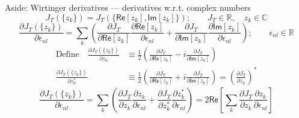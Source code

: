\documentclass[compress, aspectratio=169,usepdftitle=false]{beamer}
\renewcommand{\Re}{\mathsf{Re}}
\renewcommand{\Im}{\mathsf{Im}}
\newcommand{\Reals}{\mathbb{R}}
\newcommand{\Complex}{\mathbb{C}}
\begin{document}
\begin{frame}{Aside: Wirtinger derivatives --- derivatives w.r.t. complex numbers}
    \begin{equation*}
      J_T (\{z_k\}) = J_T(\{\Re[z_k], \Im[z_k]\}); \qquad J_T \in \Reals, \quad z_k \in \Complex
    \end{equation*}
    \pause
    \begin{equation*}
      \frac{\partial J_T (\{z_k\})}{\partial \epsilon_{nl}} =
      \sum_k \left(
        \frac{\partial J_T}{\partial \Re[z_k]}
        \frac{\partial \Re[z_k]}{\partial \epsilon_{nl}}
        + \frac{\partial J_T}{\partial \Im[z_k]}
        \frac{\partial \Im[z_k]}{\partial \epsilon_{nl}}
      \right);
      \qquad \epsilon_{nl} \in \Reals
    \end{equation*}
    \pause
    {
      \color{DarkRed}
      \begin{align*}
        \text{Define} \quad \frac{\partial J_T (\{z_k\})}{\partial z_k}
        & \equiv \frac{1}{2} \left(
          \frac{\partial J_T}{\partial \Re[z_k]}
          - i \frac{\partial J_T}{\partial \Im[z_k]}
        \right) \\
        \frac{\partial J_T (\{z_k\})}{\partial z_k^*}
        & \equiv \frac{1}{2} \left(
          \frac{\partial J_T}{\partial \Re[z_k]}
          + i \frac{\partial J_T}{\partial \Im[z_k]}
        \right)
        = \left(\frac{\partial J_T}{\partial z_k}\right)^*
      \end{align*}
    }
    \vspace{1mm}
    \pause
    \begin{equation*}
       \frac{\partial J_T (\{z_k\})}{\partial \epsilon_{nl}}
       =
       \sum_k \left(
         \frac{\partial J_T}{\partial z_k}
         \frac{\partial z_k}{\partial \epsilon_{nl}}
         + \frac{\partial J_T}{\partial z_k^*}
         \frac{\partial z_k^*}{\partial \epsilon_{nl}}
       \right)
      =
       2 \Re \left[
        \sum_k
        \frac{\partial J_T}{\partial z_k} \frac{\partial z_k}{\partial \epsilon_{nl}}
       \right]
    \end{equation*}
\end{frame}
\end{document}
